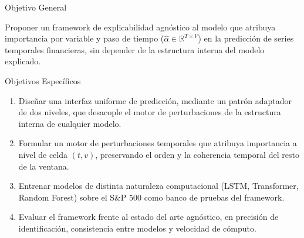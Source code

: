 \documentclass{beamer}
\begin{document}
\begin{frame}{Objetivo General}
    \begin{center}
        \vspace{0.5cm}
        \large
        Proponer un framework de explicabilidad agnóstico al modelo
        que atribuya importancia por variable y paso de tiempo
        ($\hat{\alpha} \in \mathbb{R}^{T \times V}$) en la predicción
        de series temporales financieras, sin depender de la
        estructura interna del modelo explicado.
    \end{center}
\end{frame}

\begin{frame}{Objetivos Específicos}
    \small
    \begin{enumerate}
        \item Diseñar una interfaz uniforme de predicción, mediante
        un patrón adaptador de dos niveles, que desacople el motor de
        perturbaciones de la estructura interna de cualquier modelo.
        \vspace{0.2cm}
        \item Formular un motor de perturbaciones temporales que
        atribuya importancia a nivel de celda $(t,v)$, preservando el
        orden y la coherencia temporal del resto de la ventana.
        \vspace{0.2cm}
        \item Entrenar modelos de distinta naturaleza computacional
        (LSTM, Transformer, Random Forest) sobre el S\&P 500 como
        banco de pruebas del framework.
        \vspace{0.2cm}
        \item Evaluar el framework frente al estado del arte
        agnóstico, en precisión de identificación, consistencia
        entre modelos y velocidad de cómputo.
    \end{enumerate}
\end{frame}
\end{document}
